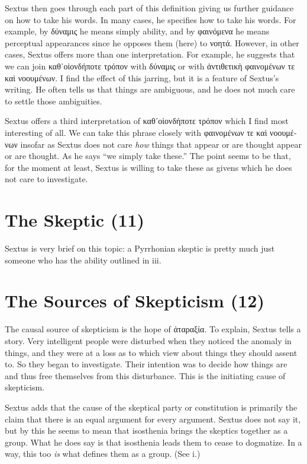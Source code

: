 Sextus then goes through each part of this definition giving us further guidance on how to take his words. In many cases, he specifies how to take his words. For example, by \textgreek{δύναμις} he means simply ability, and by \textgreek{φαινόμενα} he means perceptual appearances since he opposes them (here) to \textgreek{νοητά}. However, in other cases, Sextus offers more than one interpretation. For example, he suggests that we can join \textgreek{καθ᾽οἱονδήποτε τρόπον} with \textgreek{δύναμις} or with \textgreek{ἀντιθετικὴ φαινομένων τε καὶ νοουμένων}. I find the effect of this jarring, but it is a feature of Sextus's writing. He often tells us that things are ambiguous, and he does not much care to settle those ambiguities.

Sextus offers a third interpretation of \textgreek{καθ᾽οἱονδήποτε τρόπον} which I find most interesting of all. We can take this phrase closely with \textgreek{φαινομένων τε καὶ νοουμένων} insofar as Sextus does not care \textit{how} things that appear or are thought appear or are thought. As he says ``we simply take these.'' The point seems to be that, for the moment at least, Sextus is willing to take these as givens which he does not care to investigate.

\section*{The Skeptic (11)}

Sextus is very brief on this topic: a Pyrrhonian skeptic is pretty much just someone who has the ability outlined in iii.

\section*{The Sources of Skepticism (12)}

The causal source of skepticism is the hope of \textgreek{ἀταραξία}. To explain, Sextus tells a story. Very intelligent people were disturbed when they noticed the anomaly in things, and they were at a loss as to which view about things they should assent to. So they began to investigate. Their intention was to decide how things are and thus free themselves from this disturbance. This is the initiating cause of skepticism.

Sextus adds that the cause of the skeptical party or constitution is primarily the claim that there is an equal argument for every argument. Sextus does not say it, but by this he seems to mean that \textgreek{isosthenia} brings the skeptics together as a group. What he does say is that \textgreek{isosthenia} leads them to cease to dogmatize. In a way, this too \textit{is} what defines them as a group. (See i.)

